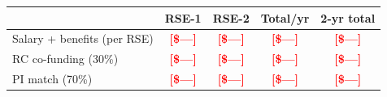 \documentclass[11pt,letter]{article}
\newcommand{\note}[1]{\textbf{\textcolor{Red}{[#1]}}}
\begin{document}
\vspace{0.6em}
\noindent{\small\note{Draft placeholder budget table---replace with Research Computing's figures once appointment levels and the match source are confirmed.}}

\begin{center}
\small
\begin{tabular}{lcccc}
\hline
 & RSE-1 & RSE-2 & \textbf{Total/yr} & \textbf{2-yr total} \\
\hline
Salary + benefits (per RSE) & \note{\$---} & \note{\$---} & \note{\$---} & \note{\$---} \\
RC co-funding (30\%)        & \note{\$---} & \note{\$---} & \note{\$---} & \note{\$---} \\
PI match (70\%)             & \note{\$---} & \note{\$---} & \note{\$---} & \note{\$---} \\
\hline
\end{tabular}
\end{center}

\newpage


\end{document}
